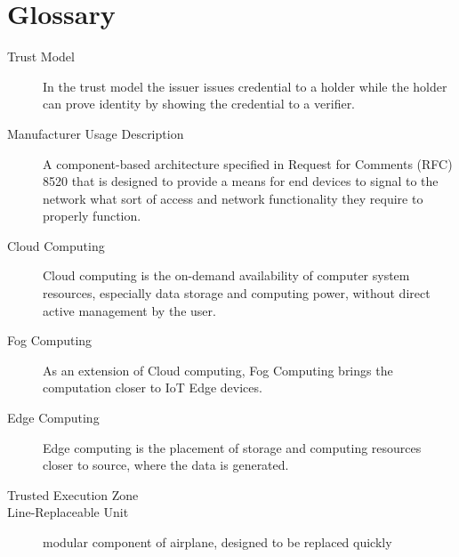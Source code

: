 \chapter*{Glossary}


\begin{description}
	\item[Trust Model] In the trust model the issuer issues credential to a holder while the holder can prove identity by
		showing the credential to a verifier.
	\item [Manufacturer Usage Description] A component-based architecture specified in Request for Comments (RFC)
	      8520 that is designed to provide a means for end devices to signal to the network what sort of access and
	      network functionality they require to properly function.
	\item [Cloud Computing] Cloud computing is the on-demand availability of computer system resources, especially
	      data storage and computing power, without direct active management by the user.
	\item [Fog Computing] As an extension of Cloud computing, Fog Computing brings the computation closer to IoT
	      Edge devices.
	\item [Edge Computing] Edge computing is the placement of storage and computing resources closer to source, where
	      the data is generated.
	\item [Trusted Execution Zone]
	\item [Line-Replaceable Unit] modular component of airplane, designed to be replaced quickly
\end{description}
